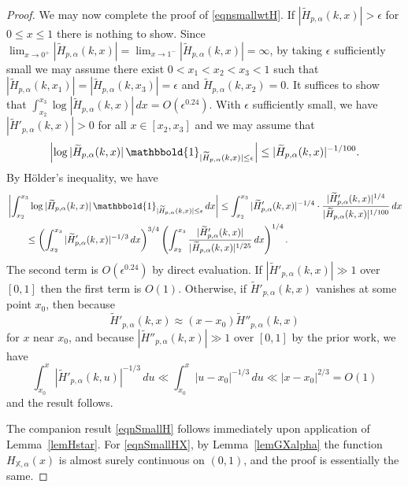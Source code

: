 \documentclass[reqno]{amsart}
\numberwithin{equation}{section}
\numberwithin{table}{section}
\numberwithin{figure}{section}
\newcommand{\abs}[1]{\left\lvert#1\right\rvert}
\begin{document}
\begin{proof}
We may now complete the proof of \eqref{eqnsmallwtH}.
If $|\widetilde{H}_{p,\alpha}(k,x)|>\epsilon$ for $0\leq x\leq1$ there is nothing to show.
Since $\lim_{x\to0^+} |\widetilde{H}_{p,\alpha}(k,x)| = \lim_{x\to1^-} |\widetilde{H}_{p,\alpha}(k,x)| = \infty$, by taking $\epsilon$ sufficiently small we may assume there exist $0<x_1<x_2<x_3<1$ such that $|\widetilde{H}_{p,\alpha}(k,x_1)|=|\widetilde{H}_{p,\alpha}(k,x_3)|=\epsilon$ and $\widetilde{H}_{p,\alpha}(k,x_2)=0$.
It suffices to show that $\int_{x_2}^{x_3} \log |\widetilde{H}_{p,\alpha}(k,x)|\,dx = O\left(\epsilon^{0.24}\right)$.
With $\epsilon$ sufficiently small, we have $|\widetilde{H}'_{p,\alpha}(k,x)| > 0$ for all $x\in[x_2,x_3]$ and we may assume that
\[
\abs{\log |\widetilde{H}_{p,\alpha}(k,x)| \, \mathbbold{1}_{|\widetilde{H}_{p,\alpha}(k,x)|\leq\epsilon}} \leq |\widetilde{H}_{p,\alpha}(k,x)|^{-1/100}.
\]
By H\"older's inequality, we have
\begin{align*}
&\abs{\int_{x_2}^{x_3} \log |\widetilde{H}_{p,\alpha}(k,x)| \, \mathbbold{1}_{|\widetilde{H}_{p,\alpha}(k,x)|\leq\epsilon}\,dx}
\leq
\int_{x_2}^{x_3} |\widetilde{H}'_{p,\alpha}(k,x)|^{-1/4} \cdot \frac{|\widetilde{H}'_{p,\alpha}(k,x)|^{1/4}}{|\widetilde{H}_{p,\alpha}(k,x)|^{1/100}} \, dx\\
&\qquad \leq
\left(\int_{x_2}^{x_3} |\widetilde{H}'_{p,\alpha}(k,x)|^{-1/3} \, dx\right)^{3/4}
\left(\int_{x_2}^{x_3} \frac{|\widetilde{H}'_{p,\alpha}(k,x)|}{|\widetilde{H}_{p,\alpha}(k,x)|^{1/25}} \, dx\right)^{1/4}.
\end{align*}
The second term is $O(\epsilon^{0.24})$ by direct evaluation.
If $|\widetilde{H}'_{p,\alpha}(k,x)|\gg1$ over $[0,1]$ then the first term is $O(1)$.
Otherwise, if $\widetilde{H}'_{p,\alpha}(k,x)$ vanishes at some point $x_0$, then because
\[
\widetilde{H}'_{p,\alpha}(k,x) \approx (x-x_0) \widetilde{H}''_{p,\alpha}(k,x)
\]
for $x$ near $x_0$, and because $|\widetilde{H}''_{p,\alpha}(k,x)|\gg1$ over $[0,1]$ by the prior work, we have
\[
\int_{x_0}^x  |\widetilde{H}'_{p,\alpha}(k,u)|^{-1/3}\,du \ll \int_{x_0}^x \abs{u-x_0}^{-1/3}\,du \ll \abs{x-x_0}^{2/3} = O(1)
\]
and the result follows.

The companion result \eqref{eqnSmallH} follows immediately upon application of Lemma~\ref{lemHstar}.
For \eqref{eqnSmallHX}, by Lemma~\ref{lemGXalpha} the function $H_{\mathbb{X},\alpha}(x)$ is almost surely continuous on $(0,1)$, and the proof is essentially the same.
\end{proof}
\end{document}
